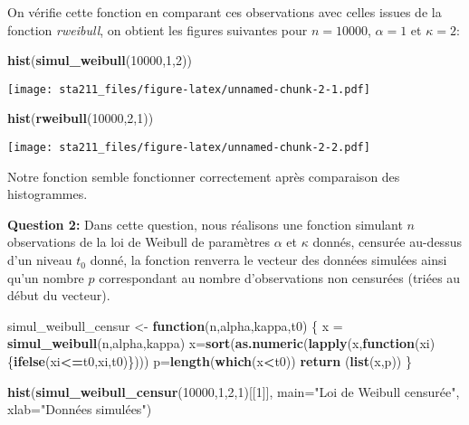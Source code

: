 \documentclass[
]{article}
\newenvironment{Shaded}{\begin{snugshade}}{\end{snugshade}}
\newcommand{\ControlFlowTok}[1]{\textcolor[rgb]{0.13,0.29,0.53}{\textbf{#1}}}
\newcommand{\DataTypeTok}[1]{\textcolor[rgb]{0.13,0.29,0.53}{#1}}
\newcommand{\DecValTok}[1]{\textcolor[rgb]{0.00,0.00,0.81}{#1}}
\newcommand{\KeywordTok}[1]{\textcolor[rgb]{0.13,0.29,0.53}{\textbf{#1}}}
\newcommand{\NormalTok}[1]{#1}
\newcommand{\OperatorTok}[1]{\textcolor[rgb]{0.81,0.36,0.00}{\textbf{#1}}}
\newcommand{\StringTok}[1]{\textcolor[rgb]{0.31,0.60,0.02}{#1}}
\begin{document}
On vérifie cette fonction en comparant ces observations avec celles
issues de la fonction \emph{rweibull}, on obtient les figures suivantes
pour \(n=10000\), \(\alpha=1\) et \(\kappa=2\):

\begin{Shaded}
\begin{Highlighting}[]
\KeywordTok{hist}\NormalTok{(}\KeywordTok{simul_weibull}\NormalTok{(}\DecValTok{10000}\NormalTok{,}\DecValTok{1}\NormalTok{,}\DecValTok{2}\NormalTok{))}
\end{Highlighting}
\end{Shaded}

\texttt{[image: sta211\_files/figure-latex/unnamed-chunk-2-1.pdf]}

\begin{Shaded}
\begin{Highlighting}[]
\KeywordTok{hist}\NormalTok{(}\KeywordTok{rweibull}\NormalTok{(}\DecValTok{10000}\NormalTok{,}\DecValTok{2}\NormalTok{,}\DecValTok{1}\NormalTok{))}
\end{Highlighting}
\end{Shaded}

\texttt{[image: sta211\_files/figure-latex/unnamed-chunk-2-2.pdf]}

Notre fonction semble fonctionner correctement après comparaison des
histogrammes.

\textbf{Question 2:} Dans cette question, nous réalisons une fonction
simulant \(n\) observations de la loi de Weibull de paramètres
\(\alpha\) et \(\kappa\) donnés, censurée au-dessus d'un niveau \(t_0\)
donné, la fonction renverra le vecteur des données simulées ainsi qu'un
nombre \(p\) correspondant au nombre d'observations non censurées
(triées au début du vecteur).

\begin{Shaded}
\begin{Highlighting}[]
\NormalTok{simul_weibull_censur <-}\StringTok{ }\ControlFlowTok{function}\NormalTok{(n,alpha,kappa,t0)}
\NormalTok{\{}
\NormalTok{  x =}\StringTok{ }\KeywordTok{simul_weibull}\NormalTok{(n,alpha,kappa)}
\NormalTok{  x=}\KeywordTok{sort}\NormalTok{(}\KeywordTok{as.numeric}\NormalTok{(}\KeywordTok{lapply}\NormalTok{(x,}\ControlFlowTok{function}\NormalTok{(xi)\{}\KeywordTok{ifelse}\NormalTok{(xi}\OperatorTok{<=}\NormalTok{t0,xi,t0)\})))}
\NormalTok{  p=}\KeywordTok{length}\NormalTok{(}\KeywordTok{which}\NormalTok{(x}\OperatorTok{<}\NormalTok{t0))}
  \KeywordTok{return}\NormalTok{ (}\KeywordTok{list}\NormalTok{(x,p))}
\NormalTok{\}}

\KeywordTok{hist}\NormalTok{(}\KeywordTok{simul_weibull_censur}\NormalTok{(}\DecValTok{10000}\NormalTok{,}\DecValTok{1}\NormalTok{,}\DecValTok{2}\NormalTok{,}\DecValTok{1}\NormalTok{)[[}\DecValTok{1}\NormalTok{]], }\DataTypeTok{main=}\StringTok{"Loi de Weibull censurée"}\NormalTok{, }\DataTypeTok{xlab=}\StringTok{"Données simulées"}\NormalTok{)}
\end{Highlighting}
\end{Shaded}
\end{document}
